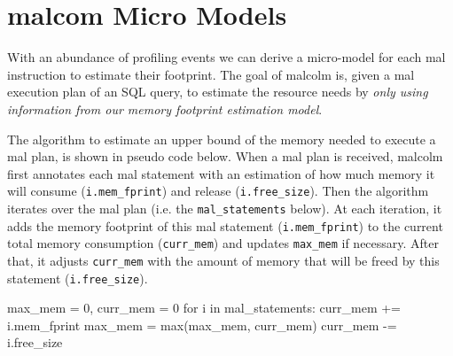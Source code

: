 \documentclass[conference]{IEEEtran}
\begin{document}


\section{{\sc malcom} Micro Models}
\label{sec:malcolm} 
With an abundance of profiling events we can derive a micro-model for each {\sc mal} instruction to estimate their footprint.
The goal of {\sc malcolm} is, given a {\sc mal} execution plan of an SQL query, to estimate the resource needs by \textit{only using information from our memory footprint estimation model}.

The algorithm to estimate an upper bound of the memory needed to execute a {\sc mal} plan, is shown in pseudo code below.
When a {\sc mal} plan is received, {\sc malcolm} first annotates each {\sc mal} statement with an estimation of how much memory it will consume (\texttt{\small i.mem\_fprint}) and release (\texttt{\small i.free\_size}).
Then the algorithm iterates over the {\sc mal} plan (i.e. the \texttt{\small mal\_statements} below).
At each iteration, it adds the memory footprint of this {\sc mal} statement (\texttt{\small i.mem\_fprint}) to the current total memory consumption (\texttt{\small curr\_mem}) and updates \texttt{\small max\_mem} if necessary.
After that, it adjusts \texttt{\small curr\_mem} with the amount of memory that will be freed by this statement (\texttt{\small i.free\_size}). 
\begin{verb}
max_mem  = 0, curr_mem = 0 
for i in mal_statements:
  curr_mem += i.mem_fprint
  max_mem = max(max_mem, curr_mem)
  curr_mem -= i.free_size
\end{verb}
\end{document}
